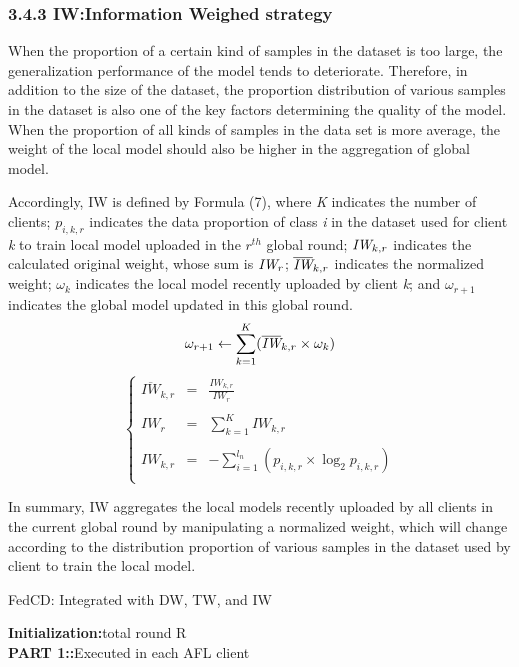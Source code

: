 \documentclass[twoside,twocolumn]{article}
\begin{document}
\begin{spacing}{1.0}
\subsubsection{3.4.3 IW:Information Weighed strategy}When the proportion of a certain kind of samples in the dataset is too large, the generalization performance of the model tends to deteriorate. Therefore, in addition to the size of the dataset, the proportion distribution of various samples in the dataset is also one of the key factors determining the quality of the model. When the proportion of all kinds of samples in the data set is more average, the weight of the local model should also be higher in the aggregation of global model.  

	Accordingly, IW is defined by Formula (7), where \emph{K} indicates the number of clients; $p_{i,k,r}$ indicates the data proportion of class \emph{i} in the dataset used for client \emph{k} to train local model uploaded in the $r^{th}$ global round; $\emph{IW}_{k,r}$ indicates the calculated original weight, whose sum is $\emph{IW}_{r}$; $\overline{\emph{IW}}_{k,r}$ indicates the normalized weight; $\omega_k$ indicates the local model recently uploaded by client \emph{k}; and $\omega_{r+1}$ indicates the global model updated in this global round.
\begin{equation}
\omega_{r+1} \leftarrow \sum_{k=1}^{K}(\overline{\emph{IW}}_{k,r} \times \omega_k)
\end{equation}
%
\begin{equation}
\left\{
\begin{array}{lll}
\overline{IW}_{k,r} & = & \frac{IW_{k,r}}{IW_{r}}\\
\\
IW_{r} & = & \sum_{k=1}^{K} IW_{k,r}\\
\\
IW_{k,r} & = & -\sum_{i=1}^{l_{n}}(p_{i,k,r} \times \log_{2}{p_{i,k,r}})\\
\end{array}
\right.
\end{equation}

	In summary, IW aggregates the local models recently uploaded by all clients in the current global round by manipulating a normalized weight, which will change according to the distribution proportion of various samples in the dataset used by client to train the local model.
%
%
\begin{algorithm}\small
\caption{FedCD: Integrated with DW, TW, and IW} 
\textbf{Initialization:}total round R\\
\textbf{PART 1::}Executed in each AFL client


\end{algorithm}
\end{spacing}
\end{document}
